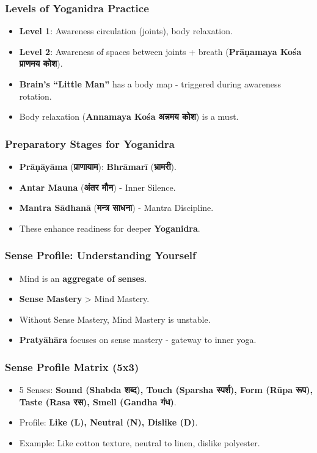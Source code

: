 \begin{frame}[fragile]\frametitle{Levels of Yoganidra Practice}
      \begin{itemize}
      \item \textbf{Level 1}: Awareness circulation (joints), body relaxation.
      \item \textbf{Level 2}: Awareness of spaces between joints + breath (\textbf{Prāṇamaya Kośa} \textbf{प्राणमय कोश}).
      \item \textbf{Brain’s “Little Man”} has a body map - triggered during awareness rotation.
      \item Body relaxation (\textbf{Annamaya Kośa} \textbf{अन्नमय कोश}) is a must.
      \end{itemize}
\end{frame}

\begin{frame}[fragile]\frametitle{Preparatory Stages for Yoganidra}
      \begin{itemize}
      \item \textbf{Prāṇāyāma} (\textbf{प्राणायाम}): \textbf{Bhrāmarī} (\textbf{भ्रामरी}).
      \item \textbf{Antar Mauna} (\textbf{अंतर मौन}) - Inner Silence.
      \item \textbf{Mantra Sādhanā} (\textbf{मन्त्र साधना}) - Mantra Discipline.
      \item These enhance readiness for deeper \textbf{Yoganidra}.
      \end{itemize}
\end{frame}

\begin{frame}[fragile]\frametitle{Sense Profile: Understanding Yourself}
      \begin{itemize}
      \item Mind is an \textbf{aggregate of senses}.
      \item \textbf{Sense Mastery} > Mind Mastery.
      \item Without Sense Mastery, Mind Mastery is unstable.
      \item \textbf{Pratyāhāra} focuses on sense mastery - gateway to inner yoga.
      \end{itemize}
\end{frame}

\begin{frame}[fragile]\frametitle{Sense Profile Matrix (5x3)}
      \begin{itemize}
      \item 5 Senses: \textbf{Sound (Shabda \textbf{शब्द}), Touch (Sparsha \textbf{स्पर्श}), Form (Rūpa \textbf{रूप}), Taste (Rasa \textbf{रस}), Smell (Gandha \textbf{गंध})}.
      \item Profile: \textbf{Like (L), Neutral (N), Dislike (D)}.
      \item Example: Like cotton texture, neutral to linen, dislike polyester.
      \end{itemize}
\end{frame}


